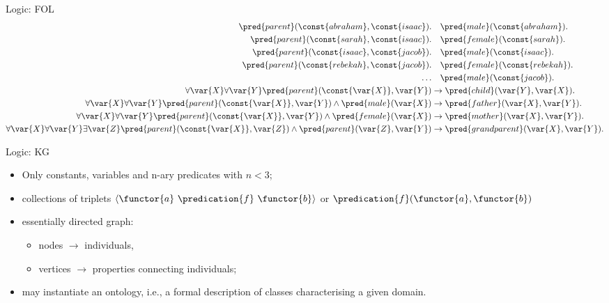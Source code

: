 \documentclass[presentation]{beamer}\mode<presentation>{\usetheme{AMSBolognaFC}}
\begin{document}
\begin{frame}[c]{Logic: FOL}
    \begin{equation*}
        \begin{aligned}
            \pred{parent}(\const{abraham},\const{isaac}). &\phantom{\rightarrow} \pred{male}(\const{abraham}).\\
            \pred{parent}(\const{sarah},\const{isaac}). &\phantom{\rightarrow} \pred{female}(\const{sarah}).\\
            \pred{parent}(\const{isaac},\const{jacob}). &\phantom{\rightarrow} \pred{male}(\const{isaac}).\\
            \pred{parent}(\const{rebekah},\const{jacob}). &\phantom{\rightarrow} \pred{female}(\const{rebekah}).\\
            \dots &\phantom{\rightarrow} \pred{male}(\const{jacob}).\\
            \forall\var{X} \forall\var{Y} \pred{parent}(\const{\var{X}},\var{Y}) &\rightarrow \pred{child}(\var{Y},\var{X}).\\
            \forall\var{X} \forall\var{Y} \pred{parent}(\const{\var{X}},\var{Y}) \wedge \pred{male}(\var{X}) &\rightarrow \pred{father}(\var{X},\var{Y}).\\
            \forall\var{X} \forall\var{Y} \pred{parent}(\const{\var{X}},\var{Y}) \wedge \pred{female}(\var{X}) &\rightarrow \pred{mother}(\var{X},\var{Y}).\\
            \forall\var{X} \forall\var{Y} \exists\var{Z} \pred{parent}(\const{\var{X}},\var{Z}) \wedge \pred{parent}(\var{Z},\var{Y}) &\rightarrow \pred{grandparent}(\var{X},\var{Y}).\\
        \end{aligned}    
    \end{equation*}
\end{frame}

\begin{frame}[c]{Logic: KG}
    \begin{itemize}
        \item Only constants, variables and n-ary predicates with $n < 3$;
        \item collections of triplets $\langle \functor{a}\ \predication{f}\ \functor{b} \rangle$ or $\predication{f}(\functor{a}, \functor{b})$
        \item essentially directed graph:
        \begin{itemize}
            \item nodes $\rightarrow$ individuals,
            \item vertices $\rightarrow$ properties connecting individuals;
        \end{itemize}
        \item may instantiate an ontology, i.e., a formal description of classes characterising a given domain.
    \end{itemize}
\end{frame}
\end{document}
